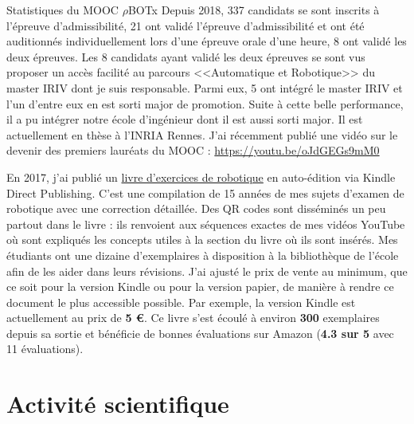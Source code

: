 \documentclass[a4paper,12pt]{article}
\newcommand{\Separation}{\noindent{\color{black!40}\rule{\textwidth}{2pt}}}
\begin{document}
\begin{flipbox}{Statistiques du MOOC $\rho$BOTx}   
   Depuis 2018, 337 candidats se sont inscrits à l'épreuve d'admissibilité,  21 ont validé l'épreuve d'admissibilité et ont été auditionnés individuellement lors d'une épreuve orale d'une heure, 8 ont validé les deux épreuves. Les 8 candidats ayant validé les deux épreuves se sont vus proposer un accès facilité au parcours <<Automatique et Robotique>> du master IRIV dont je suis responsable. Parmi eux, 5 ont intégré le master IRIV et l'un d'entre eux en est sorti major de promotion. Suite à cette belle performance, il a pu intégrer notre école d'ingénieur dont il est aussi sorti major. Il est actuellement en thèse à l'INRIA Rennes. J'ai récemment publié une vidéo sur le devenir des premiers lauréats du MOOC : \url{https://youtu.be/oJdGEGs9mM0}
\end{flipbox}

En 2017, j'ai publié un \href{https://amzn.eu/d/bexz1iP}{livre d'exercices de robotique} en auto-édition via Kindle Direct Publishing. C'est une compilation de 15 années de mes sujets d'examen de robotique avec une correction détaillée. Des QR codes sont disséminés un peu partout dans le livre : ils renvoient aux séquences exactes de mes vidéos YouTube où sont expliqués les concepts utiles à la section du livre où ils sont insérés. Mes étudiants ont une dizaine d'exemplaires à disposition à la bibliothèque de l'école afin de les aider dans leurs révisions. J'ai ajusté le prix de vente au minimum, que ce soit pour la version Kindle ou pour la version papier, de manière à rendre ce document le plus accessible possible. Par exemple, la version Kindle est actuellement au prix de {\bf 5 €}. Ce livre s'est écoulé à environ {\bf 300} exemplaires depuis sa sortie et bénéficie de bonnes évaluations sur Amazon ({\bf 4.3 sur 5} avec 11 évaluations).

\Separation{}


\section{Activité scientifique}
\newrefsection
\end{document}

